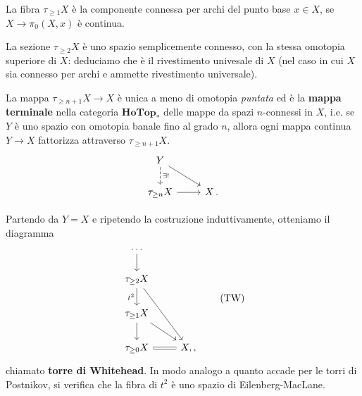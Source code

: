 \begin{ex}
	La fibra $\tau_{\ge 1}X$ è la componente connessa per archi del punto base $x \in X$,
	se $X \to \pi_{0}(X,x)$ è continua.
\end{ex}

\begin{ex}
	La sezione $\tau_{\ge 2}X$ è uno spazio semplicemente  connesso,
	con la stessa omotopia superiore di $X$: deduciamo che è il
	rivestimento univesale di $X$ (nel caso in cui $X$ sia connesso per archi
	e ammette rivestimento universale).
\end{ex}

\begin{exercise}
	La mappa $\tau_{\ge n+1} X \to X$ è unica a meno di omotopia \emph{puntata}
	ed è la \textbf{mappa terminale} nella categoria $\textbf{HoTop}_{\ast}$
	delle mappe da spazi $n$-connessi in $X$, i.e. se $Y$
	è uno spazio con omotopia banale fino al grado $n$, 
	allora ogni mappa continua $Y \to X$ fattorizza attraverso $\tau_{\ge n+1}X$.
	\begin{equation*}
		\begin{tikzcd}
			Y \ar[dr] \ar[d, dashed, "\exists !"] & \\
			\tau_{\ge n} X \ar[r] & X \,.
		\end{tikzcd}
	\end{equation*}
\end{exercise}

Partendo da $Y=X$ e ripetendo la costruzione induttivamente,
otteniamo il diagramma
\begin{equation}\label{TW}
	\begin{tikzcd}
		\dots \ar[d] & \\	
		\tau_{\ge 2}X \ar[d, "t^{2}"'] \ar[ddr] & \\
		\tau_{\ge 1}X \ar[d] \ar[dr] & \\
		\tau_{\ge 0}X  \ar[r, equals] 
		& X ,,
	\end{tikzcd}\tag{TW}
\end{equation}
chiamato \textbf{torre di Whitehead}.
In modo analogo a quanto accade per le torri di Postnikov,
si verifica che la fibra di $t^{2}$
è uno spazio di Eilenberg-MacLane.

